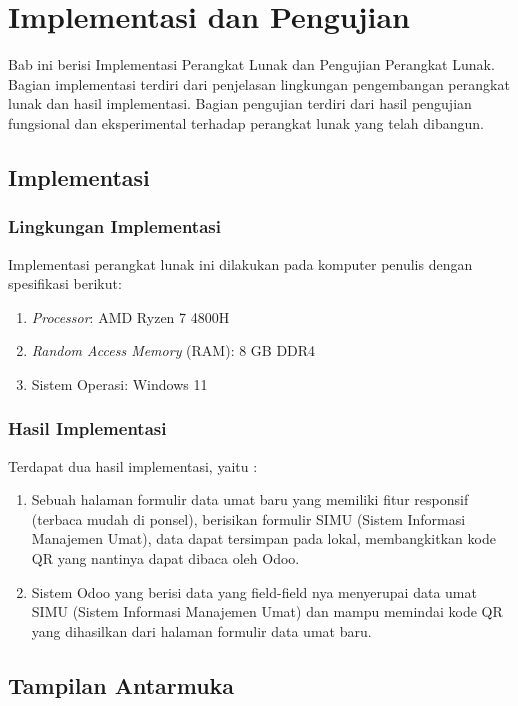 \chapter{Implementasi dan Pengujian}
\label{chap:implementasiPengujian}

Bab ini berisi Implementasi Perangkat Lunak dan Pengujian Perangkat Lunak. Bagian implementasi terdiri dari penjelasan lingkungan pengembangan perangkat lunak dan hasil implementasi. Bagian pengujian terdiri dari hasil pengujian fungsional dan eksperimental terhadap perangkat lunak yang
telah dibangun.

\section{Implementasi}
\label{sec:implementasi} 

\subsection{Lingkungan Implementasi}
Implementasi perangkat lunak ini dilakukan pada komputer penulis dengan spesifikasi berikut:

\begin{enumerate}
	\item \textit{Processor}: AMD Ryzen 7 4800H
	\item \textit{Random Access Memory} (RAM): 8 GB DDR4
	\item Sistem Operasi: Windows 11
\end{enumerate}

\subsection{Hasil Implementasi}
Terdapat dua hasil implementasi, yaitu :

\begin{enumerate}
	\item Sebuah halaman formulir data umat baru yang memiliki fitur responsif (terbaca mudah di ponsel), berisikan formulir SIMU (Sistem Informasi Manajemen Umat), data dapat tersimpan pada lokal, membangkitkan kode QR  yang nantinya dapat dibaca oleh Odoo.
	\item Sistem Odoo yang berisi data yang field-field nya menyerupai data umat SIMU (Sistem Informasi Manajemen Umat) dan mampu memindai kode QR yang dihasilkan dari halaman formulir data umat baru. 
\end{enumerate}

\section{Tampilan Antarmuka}
\label{sec:tampilanAntarMuka}

